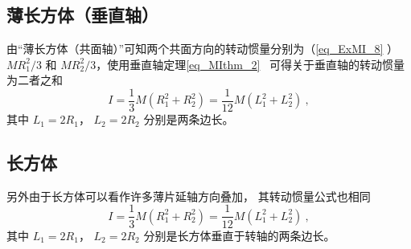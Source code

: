 \subsection{薄长方体（垂直轴）}
由“薄长方体（共面轴）”可知两个共面方向的转动惯量分别为（\autoref{eq_ExMI_8} ） $MR_1^2/3$ 和 $MR_2^2/3$，使用垂直轴定理\autoref{eq_MIthm_2}~ 可得关于垂直轴的转动惯量为二者之和
\begin{equation}\label{eq_ExMI_1}
I = \frac13 M(R_1^2 + R_2^2) = \frac{1}{12} M(L_1^2 + L_2^2)~,
\end{equation}
其中 $L_1 = 2R_1$， $L_2 = 2R_2$ 分别是两条边长。

\subsection{长方体}
另外由于长方体可以看作许多薄片延轴方向叠加， 其转动惯量公式也相同
\begin{equation}\label{eq_ExMI_9}
I = \frac13 M(R_1^2 + R_2^2) = \frac{1}{12} M(L_1^2 + L_2^2)~,
\end{equation}
其中 $L_1 = 2R_1$， $L_2 = 2R_2$ 分别是长方体垂直于转轴的两条边长。
